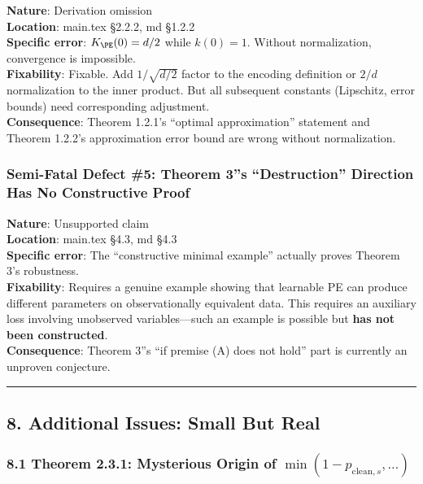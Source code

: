 \documentclass[
  12pt,
]{article}
\begin{document}
\textbf{Nature}: Derivation omission\\
\textbf{Location}: main.tex \S2.2.2, md \S1.2.2\\
\textbf{Specific error}: \(K_{\PE}(0) = d/2\) while \(k(0) = 1\). Without normalization, convergence is impossible.\\
\textbf{Fixability}: Fixable. Add \(1/\sqrt{d/2}\) factor to the encoding definition or \(2/d\) normalization to the inner product. But all subsequent constants (Lipschitz, error bounds) need corresponding adjustment.\\
\textbf{Consequence}: Theorem 1.2.1's ``optimal approximation'' statement and Theorem 1.2.2's approximation error bound are wrong without normalization.

\subsubsection{Semi-Fatal Defect \#5: Theorem 3''s ``Destruction'' Direction Has No Constructive Proof}\label{semi-fatal-5}

\textbf{Nature}: Unsupported claim\\
\textbf{Location}: main.tex \S4.3, md \S4.3\\
\textbf{Specific error}: The ``constructive minimal example'' actually proves Theorem 3's robustness.\\
\textbf{Fixability}: Requires a genuine example showing that learnable PE can produce different parameters on observationally equivalent data. This requires an auxiliary loss involving unobserved variables---such an example is possible but \textbf{has not been constructed}.\\
\textbf{Consequence}: Theorem 3''s ``if premise (A) does not hold'' part is currently an unproven conjecture.

\begin{center}\rule{0.5\linewidth}{0.5pt}\end{center}

\subsection{8. Additional Issues: Small But Real}\label{additional-issues}

\subsubsection{8.1 Theorem 2.3.1: Mysterious Origin of \(\min(1-p_{\text{clean},s}, \ldots)\)}\label{mysterious-min}
\end{document}
